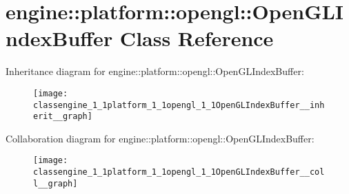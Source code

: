 \hypertarget{classengine_1_1platform_1_1opengl_1_1OpenGLIndexBuffer}{}\section{engine\+:\+:platform\+:\+:opengl\+:\+:Open\+G\+L\+Index\+Buffer Class Reference}
\label{classengine_1_1platform_1_1opengl_1_1OpenGLIndexBuffer}


Inheritance diagram for engine\+:\+:platform\+:\+:opengl\+:\+:Open\+G\+L\+Index\+Buffer\+:
\nopagebreak
\begin{figure}[H]
\begin{center}
\leavevmode
\texttt{[image: classengine\_1\_1platform\_1\_1opengl\_1\_1OpenGLIndexBuffer\_\_inherit\_\_graph]}
\end{center}
\end{figure}


Collaboration diagram for engine\+:\+:platform\+:\+:opengl\+:\+:Open\+G\+L\+Index\+Buffer\+:
\nopagebreak
\begin{figure}[H]
\begin{center}
\leavevmode
\texttt{[image: classengine\_1\_1platform\_1\_1opengl\_1\_1OpenGLIndexBuffer\_\_coll\_\_graph]}
\end{center}
\end{figure}
